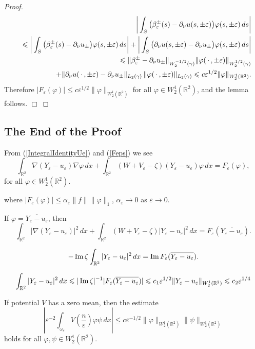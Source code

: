 \documentclass[graybox]{svmult}
\renewcommand{\Im}{\mathop{\rm Im}}
\newcommand{\Real}{\mathbb R}
\newcommand{\eps}{\varepsilon}
\renewcommand{\phi}{\varphi}
\renewcommand{\leq}{\leqslant}
\newcommand\nep{\textstyle\frac n\eps}
\newcommand{\eqref}[1]{(\ref{#1})}
\begin{document}
\begin{proof}
\begin{eqnarray}
&&\bigg|\int_S \big(\beta_\eps^\pm(s)-\partial_\nu u(s,\pm\eps)\big)\phi(s,\pm\eps)\,ds\bigg|\\\nonumber
&&\leq\bigg|\int_S \big(\beta_\eps^\pm(s)-\partial_\nu u_\pm\big)\phi(s,\pm\eps)\,ds\bigg|+
\bigg|\int_S \big(\partial_\nu u(s,\pm\eps)-\partial_\nu u_\pm\big)\phi(s,\pm\eps)\,ds\bigg|
\\\nonumber
&&\leq \|\beta_\eps^\pm-\partial_\nu u_\pm\|_{W_2^{-1/2}(\gamma)} \|\phi(\,\cdot\,,\pm\eps)\|_{W_2^{1/2}(\gamma)}\\\nonumber
&&\kern40pt+\|\partial_\nu u(\,\cdot\,,\pm\eps)-\partial_\nu u_\pm\|
_{L_2(\gamma )}\,\|\phi(\,\cdot\,,\pm\eps)\|_{L_2(\gamma)}\leq c\eps^{1/2} \|\phi\|_{W_2^1(\Real^2)}.
\end{eqnarray}
Therefore $|F_\eps(\phi)|\leq c\eps^{1/2}\|\phi\|_{W_2^1(\Real^2)}$
for all $\phi\in W_2^1(\Real^2)$, and the lemma follows.
\hfill$\Box$
\end{proof}



\subsection{The End of the Proof}

From \eqref{IntegralIdentityUe} and  \eqref{Feps} we see
$$
\int_{\Real^2}\nabla (Y_\eps-u_\eps) \nabla \phi\,dx+
             \int_{\Real^2} (W+V_\eps-\zeta)(Y_\eps-u_\eps) \phi\,dx=F_\eps(\phi),
$$
for all $\phi\in W_2^1(\Real^2)$.




where $|F_\eps(\phi)|\leq \alpha_\eps\|f\| \|\phi\|_1$, $\alpha_\eps\to 0$ as $\eps\to 0$.

If $\phi=\overline{Y_\eps-u_\eps}$, then
$$
\int_{\Real^2}|\nabla (Y_\eps-u_\eps)|^2\,dx+
             \int_{\Real^2} (W+V_\eps-\zeta)|Y_\eps-u_\eps|^2\,dx=F_\eps(\overline{Y_\eps-u_\eps}).
$$

$$
-\Im \zeta \int_{\Real^2}|Y_\eps-u_\eps|^2\,dx=\Im F_\eps(\overline{Y_\eps-u_\eps}).
$$


$$
 \int_{\Real^2}|Y_\eps-u_\eps|^2\,dx\leq |\Im \zeta|^{-1} |F_\eps(\overline{Y_\eps-u_\eps})|\leq c_1\eps^{1/2}\|Y_\eps-u_\eps\|_{W_2^1(\Real^2)}\leq c_2\eps^{1/4}
$$

\begin{lemma}
If potential $V$ has a zero mean, then the estimate
$$
  \left|\eps^{-2}\int_{\omega_\eps}V(\nep)\phi \psi\,dx\right|\leq c\eps^{-1/2}\|\phi\|_{W_2^1(\Real^2)}\|\psi\|_{W_2^1(\Real^2)}
$$
holds for all $\phi, \psi \in W_2^1(\Real^2)$.
\end{lemma}
\end{document}
